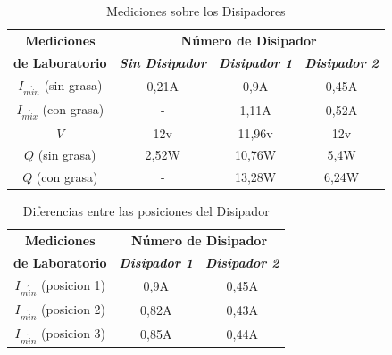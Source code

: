 \documentclass[conference]{IEEEtran}
\begin{document}
\begin{table}[htbp]
    \caption{Mediciones sobre los Disipadores}
    \begin{center}
    \begin{tabular}{|c|c|c|c|}
    \hline
    \textbf{Mediciones} & \multicolumn{3}{|c|}{\textbf{Número de Disipador}} \\
    \cline{2-4} 
    \textbf{de Laboratorio} & \textbf{\textit{Sin Disipador}} & \textbf{\textit{Disipador 1}} & \textbf{\textit{Disipador 2}} \\
    \hline
    $I_{m\acute{i}n}$ (sin grasa) & 0,21A & 0,9A & 0,45A \\
    \hline
    $I_{m\acute{i}x}$ (con grasa) & - & 1,11A & 0,52A \\
    \hline
    $V$ & 12v & 11,96v & 12v \\
    \hline
    $Q$ (sin grasa) & 2,52W & 10,76W & 5,4W \\
    \hline
    $Q$ (con grasa) & - & 13,28W & 6,24W \\
    \hline
    \end{tabular}
    \label{tab1}
    \end{center}
    \end{table}

    \begin{table}[htbp]
        \caption{Diferencias entre las posiciones del Disipador}
        \begin{center}
        \begin{tabular}{|c|c|c|}
        \hline
        \textbf{Mediciones} & \multicolumn{2}{c|}{\textbf{Número de Disipador}} \\
        \cline{2-3}
        \textbf{de Laboratorio} & \textbf{\textit{Disipador 1}} & \textbf{\textit{Disipador 2}} \\
        \hline
        $I_{m\acute{i}n}$ (posicion 1) & 0,9A & 0,45A \\
        \hline
        $I_{m\acute{i}n}$ (posicion 2) & 0,82A & 0,43A \\
        \hline
        $I_{m\acute{i}n}$ (posicion 3) & 0,85A & 0,44A \\
        \hline
        
        \end{tabular}
        \label{tab1}
        \end{center}
    \end{table}
\end{document}
